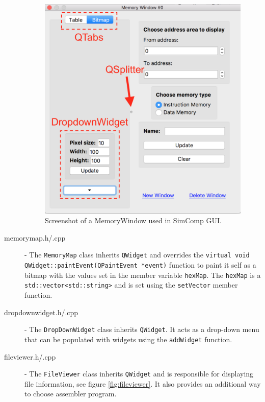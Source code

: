 \begin{description}
\begin{figure}[H]
\centering
\includegraphics[scale=0.35]{img/MemoryWindow.png}
\caption{Screenshot of a MemoryWindow used in SimComp GUI.}
\label{fig:memorywindow}
\end{figure}

\item [memorymap.h/.cpp] - The \texttt{MemoryMap} class inherits \texttt{QWidget} and overrides the \texttt{virtual void QWidget::paintEvent(QPaintEvent *event)} function to paint it self as a bitmap with the values set in the member variable \texttt{hexMap}. The \texttt{hexMap} is a \texttt{std::vector<std::string>} and is set using the \texttt{setVector} member function.

\item [dropdownwidget.h/.cpp] - The \texttt{DropDownWidget} class inherits \texttt{QWidget}. It acts as a drop-down menu that can be populated with widgets using the \texttt{addWidget} function.

\item [fileviewer.h/.cpp] - The \texttt{FileViewer} class inherits \texttt{QWidget} and is responsible for displaying file information, see figure \ref{fig:fileviewer}. It also provides an additional way to choose assembler program. 


\end{description}
